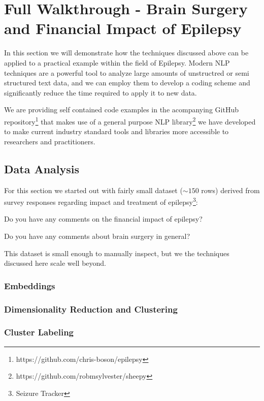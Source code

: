 \section{Full Walkthrough - Brain Surgery and Financial Impact of Epilepsy}

In this section we will demonstrate how the techniques discussed above can be applied to a practical example within the field of Epilepsy.
Modern NLP techniques are a powerful tool to analyze large amounts of unstructred or semi structured text data, and we can employ them to develop a coding scheme and significantly reduce the time required to apply it to new data.

We are providing self contained code examples in the acompanying GitHub repository\footnote{https://github.com/chris-boson/epilepsy} that makes use of a general purpose NLP library\footnote{https://github.com/robmsylvester/sheepy} we have developed to make current industry standard tools and libraries more accessible to researchers and practitioners.


\subsection{Data Analysis}
For this section we started out with fairly small dataset ($\sim150$ rows) derived from survey responses regarding  impact and treatment of epilepsy\footnote{Seizure Tracker}:
\begin{displayquote}
    Do you have any comments on the financial impact of epilepsy?

    Do you have any comments about brain surgery in general?
\end{displayquote}
This dataset is small enough to manually inspect, but we the techniques discussed here scale well beyond.
\subsubsection*{Embeddings}

\subsubsection*{Dimensionality Reduction and Clustering}
\subsubsection*{Cluster Labeling}
